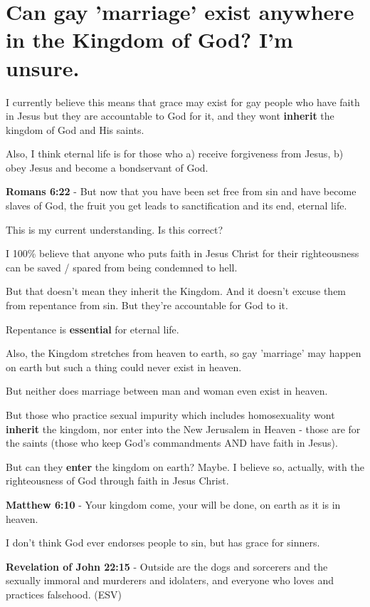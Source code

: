 \documentclass[11pt]{article}
\begin{document}
\section{Can gay 'marriage' exist anywhere in the Kingdom of God? I'm unsure.}
\label{sec:orgdb49903}
I currently believe this means that grace may
exist for gay people who have faith in Jesus
but they are accountable to God for it, and
they wont \textbf{inherit} the kingdom of God and His saints.

Also, I think eternal life is for those who a) receive forgiveness from Jesus, b) obey Jesus and become a bondservant of God.

\textbf{Romans 6:22} - But now that you have been set free from sin and have become slaves of God, the fruit you get leads to sanctification and its end, eternal life.

This is my current understanding. Is this correct?

I 100\% believe that anyone who puts faith in Jesus Christ for their righteousness can be saved / spared from being condemned to hell.

But that doesn't mean they inherit the Kingdom.
And it doesn't excuse them from repentance from sin.
But they're accountable for God to it.

Repentance is \textbf{essential} for eternal life.

Also, the Kingdom stretches from heaven to earth, so gay 'marriage' may happen on earth but such a thing could never exist in heaven.

But neither does marriage between man and woman even exist in heaven.

But those who practice sexual impurity which includes homosexuality wont \textbf{inherit} the kingdom, nor enter into the New Jerusalem in Heaven - those are for the saints (those who keep God's commandments AND have faith in Jesus).

But can they \textbf{enter} the kingdom on earth? Maybe. I believe so, actually, with the righteousness of God through faith in Jesus Christ.

\textbf{Matthew 6:10} - Your kingdom come, your will be done, on earth as it is in heaven.

I don't think God ever endorses people to sin, but has grace for sinners.

\textbf{Revelation of John 22:15} - Outside are the dogs and sorcerers and the sexually immoral and murderers and idolaters, and everyone who loves and practices falsehood. (ESV)
\end{document}
